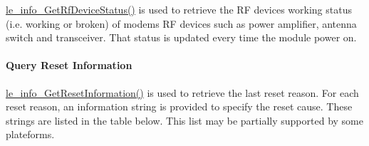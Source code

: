 \hyperlink{le__info__interface_8h_ac84294095316b12bb28aaeb4de82e660}{le\+\_\+info\+\_\+\+Get\+Rf\+Device\+Status()} is used to retrieve the RF devices working status (i.\+e. working or broken) of modem\textquotesingle{}s RF devices such as power amplifier, antenna switch and transceiver. That status is updated every time the module power on.\hypertarget{c_info_le_info_reset}{}\paragraph{Query Reset Information}\label{c_info_le_info_reset}
\hyperlink{le__info__interface_8h_a39f1a1db52b1e153466859b0cfa46898}{le\+\_\+info\+\_\+\+Get\+Reset\+Information()} is used to retrieve the last reset reason. For each reset reason, an information string is provided to specify the reset cause. These strings are listed in the table below. This list may be partially supported by some plateforms.

